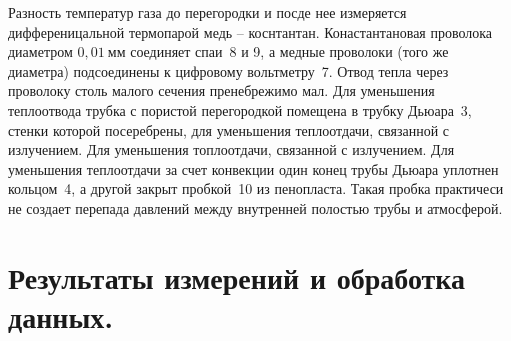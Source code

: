 \documentclass[a4paper,11pt]{article}
\begin{document}
Разность температур газа до перегородки и посде нее измеряется дифференицальной термопарой медь -- коснтантан. Конастантановая проволока диаметром $0,01\ мм$ соединяет спаи~8 и 9, а медные проволоки (того же диаметра) подсоединены к цифровому вольтметру~7. Отвод тепла через проволоку столь малого сечения пренебрежимо мал. Для уменьшения теплоотвода трубка с пористой перегородкой помещена в трубку Дьюара~3, стенки которой посеребрены, для уменьшения теплоотдачи, связанной с излучением. Для уменьшения топлоотдачи, связанной с излучением. Для уменьшения теплоотдачи за счет конвекции один конец трубы Дьюара уплотнен кольцом~4, а другой закрыт пробкой~10 из пенопласта. Такая пробка практичеси не создает перепада давлений между внутренней полостью трубы и атмосферой.
\section{Результаты измерений и обработка данных.}
\end{document}
